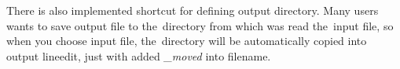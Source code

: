 There is also implemented shortcut for defining output directory. Many users wants to save output file to
the~directory from which was read the~input file, so when you choose input file, the~directory will
be automatically copied into output lineedit, just with added \textit{\_moved} into filename. 
